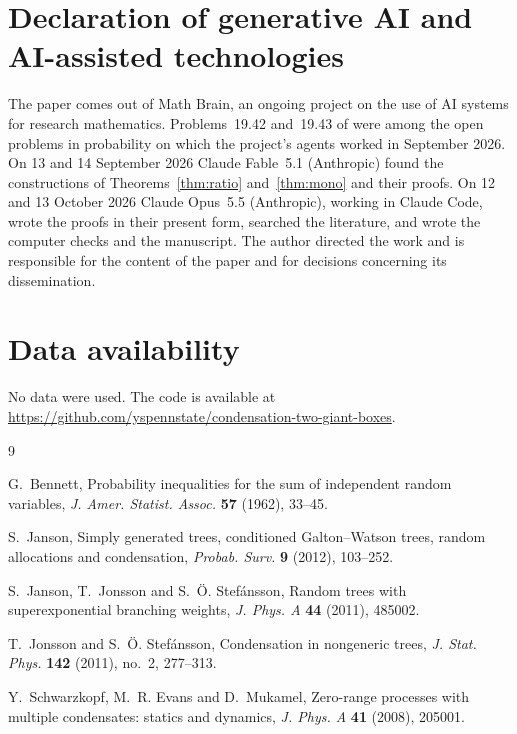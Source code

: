 \documentclass[11pt]{amsart}
\theoremstyle{remark}
\numberwithin{equation}{section}
\begin{document}
\section*{Declaration of generative AI and AI-assisted technologies}
The paper comes out of Math Brain, an ongoing project on the use of AI systems for research mathematics. Problems~19.42 and~19.43 of \cite{J12} were among the open problems in probability on which the project's agents worked in September 2026. On 13 and 14 September 2026 Claude Fable~5.1 (Anthropic) found the constructions of Theorems~\ref{thm:ratio} and~\ref{thm:mono} and their proofs. On 12 and 13 October 2026 Claude Opus~5.5 (Anthropic), working in Claude Code, wrote the proofs in their present form, searched the literature, and wrote the computer checks and the manuscript. The author directed the work and is responsible for the content of the paper and for decisions concerning its dissemination.

\section*{Data availability}
No data were used. The code is available at\\ \url{https://github.com/yspennstate/condensation-two-giant-boxes}.

\begin{thebibliography}{9}

G.~Bennett, Probability inequalities for the sum of independent random variables, \emph{J. Amer. Statist. Assoc.} \textbf{57} (1962), 33--45.

S.~Janson, Simply generated trees, conditioned Galton--Watson trees, random allocations and condensation, \emph{Probab. Surv.} \textbf{9} (2012), 103--252.

S.~Janson, T.~Jonsson and S.~\"O. Stef\'ansson, Random trees with superexponential branching weights, \emph{J. Phys. A} \textbf{44} (2011), 485002.

T.~Jonsson and S.~\"O. Stef\'ansson, Condensation in nongeneric trees, \emph{J. Stat. Phys.} \textbf{142} (2011), no.~2, 277--313.

Y.~Schwarzkopf, M.~R. Evans and D.~Mukamel, Zero-range processes with multiple condensates: statics and dynamics, \emph{J. Phys. A} \textbf{41} (2008), 205001.

\end{thebibliography}
\end{document}
